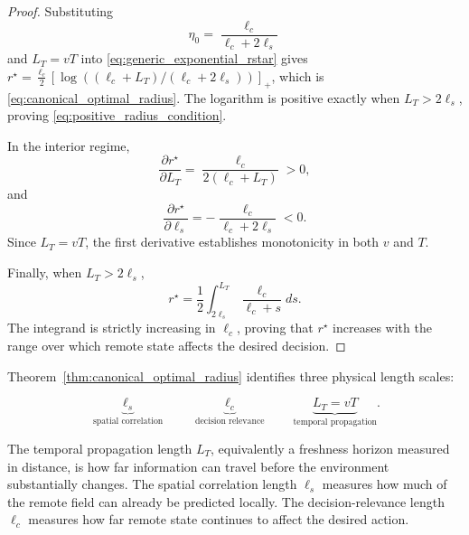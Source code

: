 \documentclass[11pt]{article}
\begin{document}
\begin{proof}
Substituting
\[
    \eta_0
    =
    \frac{\ell_c}{\ell_c+2\ell_s}
\]
and $L_T=vT$ into
\eqref{eq:generic_exponential_rstar} gives
$r^\star=\frac{\ell_c}{2}
[\log((\ell_c+L_T)/(\ell_c+2\ell_s))]_+$, which is
\eqref{eq:canonical_optimal_radius}.
The logarithm is positive exactly when $L_T>2\ell_s$, proving
\eqref{eq:positive_radius_condition}.

In the interior regime,
\begin{equation}
    \frac{
        \partial r^\star
    }{
        \partial L_T
    }
    =
    \frac{
        \ell_c
    }{
        2(\ell_c+L_T)
    }
    >0,
    \label{eq:rstar_LT_derivative}
\end{equation}
and
\begin{equation}
    \frac{
        \partial r^\star
    }{
        \partial \ell_s
    }
    =
    -
    \frac{
        \ell_c
    }{
        \ell_c+2\ell_s
    }
    <0.
    \label{eq:rstar_ls_derivative}
\end{equation}
Since $L_T=vT$, the first derivative establishes monotonicity in both $v$
and $T$.

Finally, when $L_T>2\ell_s$,
\begin{equation}
    r^\star
    =
    \frac{1}{2}
    \int_{2\ell_s}^{L_T}
    \frac{
        \ell_c
    }{
        \ell_c+s
    }
    ds.
    \label{eq:rstar_integral_representation}
\end{equation}
The integrand is strictly increasing in $\ell_c$, proving that
$r^\star$ increases with the range over which remote state affects the
desired decision.
\end{proof}

Theorem~\ref{thm:canonical_optimal_radius} identifies three physical length
scales:

\begin{equation}
    \boxed{
    \underbrace{\ell_s}_{\text{spatial correlation}}
    \qquad
    \underbrace{\ell_c}_{\text{decision relevance}}
    \qquad
    \underbrace{L_T=vT}_{\text{temporal propagation}}.
    }
    \label{eq:three_length_scales}
\end{equation}

The temporal propagation length $L_T$, equivalently a freshness horizon
measured in distance, is how far information can travel before the
environment substantially changes. The spatial correlation length $\ell_s$
measures how much of the remote field can already be predicted locally. The
decision-relevance length $\ell_c$ measures how far remote state continues to
affect the desired action.
\end{document}
